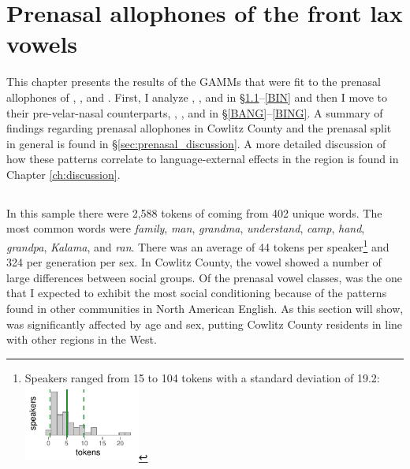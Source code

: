 \chapter{Prenasal allophones of the front lax vowels}
\label{ch:prenasal}



This chapter presents the results of the GAMMs that were fit to the prenasal allophones of \trap, \dress, and \kit. First, I analyze \ban, \ben, and \bin in \S\ref{BAN}--\ref{BIN} and then I move to their pre-velar-nasal counterparts, \bang, \beng, and \bing in \S\ref{BANG}--\ref{BING}. A summary of findings regarding prenasal allophones in Cowlitz County and the prenasal split in general is found in \S\ref{sec:prenasal_discussion}. A more detailed discussion of how these patterns correlate to language-external effects in the region is found in Chapter \ref{ch:discussion}.

\section{\ban}
\label{BAN}

In this sample there were 2,588 tokens of \ban coming from 402 unique words. The most common words were \textit{family}, \textit{man}, \textit{grandma}, \textit{understand}, \textit{camp}, \textit{hand}, \textit{grandpa}, \textit{Kalama}, and \textit{ran}. There was an average of 44 tokens per speaker\footnote{Speakers ranged from 15 to 104 tokens with a standard deviation of 19.2: \includegraphics[width = 1.5in]{Figures/BANG/BANG_tiny.pdf}} and 324 per generation per sex. In Cowlitz County, the \ban vowel showed a number of large differences between social groups. Of the prenasal vowel classes, \ban was the one that I expected to exhibit the most social conditioning because of the patterns found in other communities in North American English. As this section will show, \ban was significantly affected by age and sex, putting Cowlitz County residents in line with other regions in the West.

